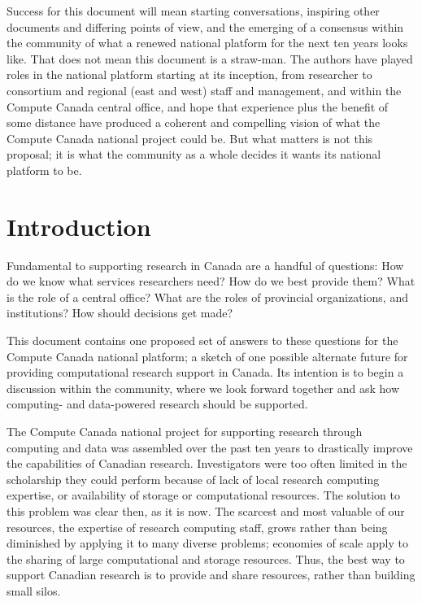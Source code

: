 \documentclass[11pt, letterpaper, twoside]{article}
\begin{document}
\begin{executive}
Success for this document will mean starting conversations, inspiring
other documents and differing points of view, and the emerging of a
consensus within the community of what a renewed national platform for
the next ten years looks like. That does not mean this document is a
straw-man. The authors have played roles in the national platform
starting at its inception, from researcher to consortium and regional
(east and west) staff and management, and within the Compute Canada
central office, and hope that experience plus the benefit of some
distance have produced a coherent and compelling vision of what the
Compute Canada national project could be. But what matters is not this
proposal; it is what the community as a whole decides it wants its
national platform to be.
\end{executive} 

\newpage
\listofproposal
\newpage
\tableofcontents

\cleardoublepage
{}

\section*{Introduction} 
%

Fundamental to supporting research in Canada are a handful of questions:
How do we know what services researchers need? How do we best provide
them? What is the role of a central office? What are the roles of
provincial organizations, and institutions? How should decisions get
made?

This document contains one proposed set of answers to these questions
for the Compute Canada national platform; a sketch of one possible
alternate future for providing computational research support in Canada.
Its intention is to begin a discussion within the community, where we
look forward together and ask how computing- and data-powered research
should be supported.

The Compute Canada national project for supporting research through
computing and data was assembled over the past ten years to drastically
improve the capabilities of Canadian research. Investigators were too
often limited in the scholarship they could perform because of lack of
local research computing expertise, or availability of storage or
computational resources. The solution to this problem was clear then, as
it is now.  The scarcest and most valuable of our resources, the
expertise of research computing staff, grows rather than being
diminished by applying it to many diverse problems; economies of scale
apply to the sharing of large computational and storage resources. Thus,
the best way to support Canadian research is to provide and share
resources, rather than building small silos.
\end{document}
